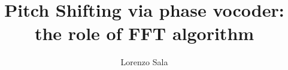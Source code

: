 \documentclass{article}
\begin{document}
	\title{Pitch Shifting via phase vocoder: the role of FFT algorithm}
	\author{Lorenzo Sala}
	\date{}
	\maketitle
	\tableofcontents




\listofalgorithms
\printbibliography
\end{document}
